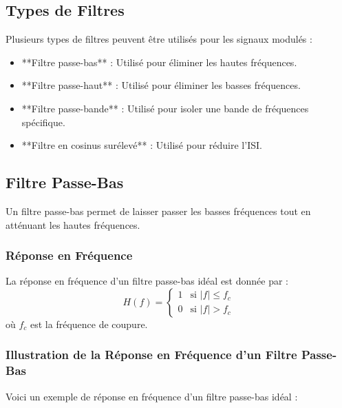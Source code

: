 \documentclass[10pt,a4paper]{article}
\begin{document}
\subsection*{Types de Filtres}
Plusieurs types de filtres peuvent être utilisés pour les signaux modulés :
\begin{itemize}
    \item **Filtre passe-bas** : Utilisé pour éliminer les hautes fréquences.
    \item **Filtre passe-haut** : Utilisé pour éliminer les basses fréquences.
    \item **Filtre passe-bande** : Utilisé pour isoler une bande de fréquences spécifique.
    \item **Filtre en cosinus surélevé** : Utilisé pour réduire l'ISI.
\end{itemize}

\subsection*{Filtre Passe-Bas}
Un filtre passe-bas permet de laisser passer les basses fréquences tout en atténuant les hautes fréquences.

\subsubsection*{Réponse en Fréquence}
La réponse en fréquence d'un filtre passe-bas idéal est donnée par :
\[ H(f) = \begin{cases}
1 & \text{si } |f| \leq f_c \\
0 & \text{si } |f| > f_c
\end{cases} \]
où \( f_c \) est la fréquence de coupure.

\subsubsection*{Illustration de la Réponse en Fréquence d'un Filtre Passe-Bas}
Voici un exemple de réponse en fréquence d'un filtre passe-bas idéal :

\end{document}
